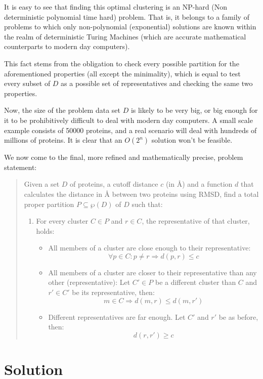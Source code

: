 \documentclass[a4paper,12pt,english]{report}
\begin{document}
It is easy to see that finding this optimal clustering is an NP-hard (Non deterministic polynomial time hard) problem. That is, it belongs to a family of problems to which only non-polynomial (exponential) solutions are known within the realm of deterministic Turing Machines (which are accurate mathematical counterparts to modern day computers).

This fact stems from the obligation to check every possible partition for the aforementioned properties (all except the minimality), which is equal to test every subset of $D$ as a possible set of representatives and checking the same two properties.

Now, the size of the problem data set $D$ is likely to be very big, or big enough for it to be prohibitively difficult to deal with modern day computers. A small scale example consists of 50000 proteins, and a real scenario will deal with hundreds of millions of proteins. It is clear that an $O(2^n)$ solution won't be feasible.

We now come to the final, more refined and mathematically precise, problem statement:

\begin{quote}
Given a set $D$ of proteins, a cutoff distance $c$ (in \AA{}) and a function $d$ that calculates the distance in \AA{} between two proteins using RMSD, find a total proper partition $P \subseteq \wp (D)$ of $D$ such that:
\begin{enumerate}
\item For every cluster $C \in P$ and $r \in C$, the representative of that cluster, holds:
  \begin{itemize}
  \item All members of a cluster are close enough to their representative:
      $$\forall p \in C : p \neq r \Rightarrow d(p,r) \leq c$$
  \item All members of a cluster are closer to their representative than any other (representative): Let $C' \in P$ be a different cluster than $C$ and $r' \in C'$ be its representative, then:
      $$m \in C \Rightarrow d(m,r) \leq d(m,r')$$
  \item Different representatives are far enough. Let $C'$ and $r'$ be as before, then:
      $$d(r,r') \geq c$$
  \end{itemize}
\end{enumerate}
\end{quote}

\chapter{Solution}
\end{document}
